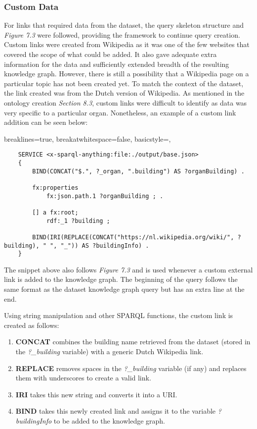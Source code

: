 \subsubsection{Custom Data}
\hspace*{0.5cm} For links that required data from the dataset, the query skeleton structure and \textit{Figure 7.3} were followed, providing the framework to continue query creation. Custom links were created from Wikipedia as it was one of the few websites that covered the scope of what could be added. It also gave adequate extra information for the data and sufficiently extended breadth of the resulting knowledge graph. However, there is still a possibility that a Wikipedia page on a particular topic has not been created yet. To match the context of the dataset, the link created was from the Dutch version of Wikipedia. As mentioned in the ontology creation \textit{Section 8.3}, custom links were difficult to identify as data was very specific to a particular organ. Nonetheless, an example of a custom link addition can be seen below:

\lstset
{
    breaklines=true,
    breakatwhitespace=false,
    basicstyle=\linespread{1.5}\ttfamily,
}
\begin{lstlisting}
    SERVICE <x-sparql-anything:file:./output/base.json>
    {
        BIND(CONCAT("$.", ?_organ, ".building") AS ?organBuilding) .
    
        fx:properties
            fx:json.path.1 ?organBuilding ; .
    
        [] a fx:root; 
            rdf:_1 ?building ;
    
        BIND(IRI(REPLACE(CONCAT("https://nl.wikipedia.org/wiki/", ?building), " ", "_")) AS ?buildingInfo) . 
    } 
\end{lstlisting}

The snippet above also follows \textit{Figure 7.3} and is used whenever a custom external link is added to the knowledge graph. The beginning of the query follows the same format as the dataset knowledge graph query but has an extra line at the end.

Using string manipulation and other SPARQL functions, the custom link is created as follows:
\begin{enumerate}
    \item \textbf{CONCAT} combines the building name retrieved from the dataset (stored in the \textit{?\_building} variable) with a generic Dutch Wikipedia link.
    \item \textbf{REPLACE} removes spaces in the \textit{?\_building} variable (if any) and replaces them with underscores to create a valid link. 
    \item \textbf{IRI} takes this new string and converts it into a URI.
    \item \textbf{BIND} takes this newly created link and assigns it to the variable \textit{?buildingInfo} to be added to the knowledge graph. 
\end{enumerate}

